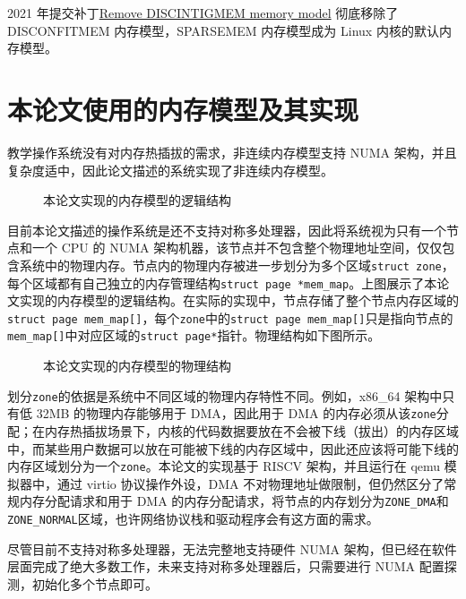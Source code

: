 \documentclass[AutoFakeBold]{LZUThesis}
\begin{document}
\begin{sloppypar}
2021 年提交补丁\href{https://lwn.net/Articles/858333}{Remove
DISCINTIGMEM memory model} 彻底移除了 DISCONFITMEM 内存模型，SPARSEMEM
内存模型成为 Linux 内核的默认内存模型。


\section{本论文使用的内存模型及其实现}

教学操作系统没有对内存热插拔的需求，非连续内存模型支持 NUMA
架构，并且复杂度适中，因此论文描述的系统实现了非连续内存模型。

\begin{figure}
\centering

\caption{本论文实现的内存模型的逻辑结构}
\end{figure}

目前本论文描述的操作系统是还不支持对称多处理器，因此将系统视为只有一个节点和一个
CPU 的 NUMA
架构机器，该节点并不包含整个物理地址空间，仅仅包含系统中的物理内存。节点内的物理内存被进一步划分为多个区域\texttt{struct\ zone}，每个区域都有自己独立的内存管理结构\texttt{struct\ page\ *mem\_map}。上图展示了本论文实现的内存模型的逻辑结构。在实际的实现中，节点存储了整个节点内存区域的\texttt{struct\ page\ mem\_map{[}{]}}，每个\texttt{zone}中的\texttt{struct\ page\ mem\_map{[}{]}}只是指向节点的\texttt{mem\_map{[}{]}}中对应区域的\texttt{struct\ page*}指针。物理结构如下图所示。

\begin{figure}
\centering

\caption{本论文实现的内存模型的物理结构}
\end{figure}

划分\texttt{zone}的依据是系统中不同区域的物理内存特性不同。例如，x86\_64
架构中只有低 32MB 的物理内存能够用于 DMA，因此用于 DMA
的内存必须从该\texttt{zone}分配；在内存热插拔场景下，内核的代码数据要放在不会被下线（拔出）的内存区域中，而某些用户数据可以放在可能被下线的内存区域中，因此还应该将可能下线的内存区域划分为一个\texttt{zone}。本论文的实现基于
RISCV 架构，并且运行在 qemu 模拟器中，通过 virtio 协议操作外设，DMA
不对物理地址做限制，但仍然区分了常规内存分配请求和用于 DMA
的内存分配请求，将节点的内存划分为\texttt{ZONE\_DMA}和\texttt{ZONE\_NORMAL}区域，也许网络协议栈和驱动程序会有这方面的需求。

尽管目前不支持对称多处理器，无法完整地支持硬件 NUMA
架构，但已经在软件层面完成了绝大多数工作，未来支持对称多处理器后，只需要进行
NUMA 配置探测，初始化多个节点即可。


\end{sloppypar}
\end{document}
